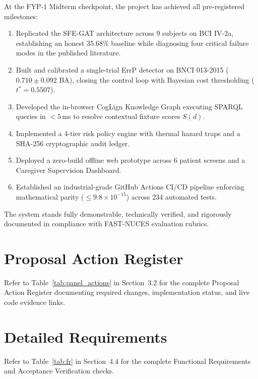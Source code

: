 \documentclass[12pt,a4paper]{report}
\begin{document}
At the FYP-1 Midterm checkpoint, the project has achieved all pre-registered milestones:
\begin{enumerate}[leftmargin=1.5em]
    \item Replicated the SFE-GAT architecture across 9 subjects on BCI IV-2a, establishing an honest 35.68\% baseline while diagnosing four critical failure modes in the published literature.
    \item Built and calibrated a single-trial ErrP detector on BNCI 013-2015 ($0.710 \pm 0.092$ BA), closing the control loop with Bayesian cost thresholding ($t^* = 0.5507$).
    \item Developed the in-browser CogLign Knowledge Graph executing SPARQL queries in $< 5$\,ms to resolve contextual fixture scores $S(d)$.
    \item Implemented a 4-tier risk policy engine with thermal hazard traps and a SHA-256 cryptographic audit ledger.
    \item Deployed a zero-build offline web prototype across 6 patient screens and a Caregiver Supervision Dashboard.
    \item Established an industrial-grade GitHub Actions CI/CD pipeline enforcing mathematical parity ($\le 9.8 \times 10^{-15}$) across 234 automated tests.
\end{enumerate}
The system stands fully demonstrable, technically verified, and rigorously documented in compliance with FAST-NUCES evaluation rubrics.

\appendix

\chapter{Proposal Action Register}
\label{app:action_register}
Refer to Table~\ref{tab:panel_actions} in Section~3.2 for the complete Proposal Action Register documenting required changes, implementation status, and live code evidence links.

\chapter{Detailed Requirements}
\label{app:requirements}
Refer to Table~\ref{tab:fr} in Section~4.4 for the complete Functional Requirements and Acceptance Verification checks.
\end{document}
